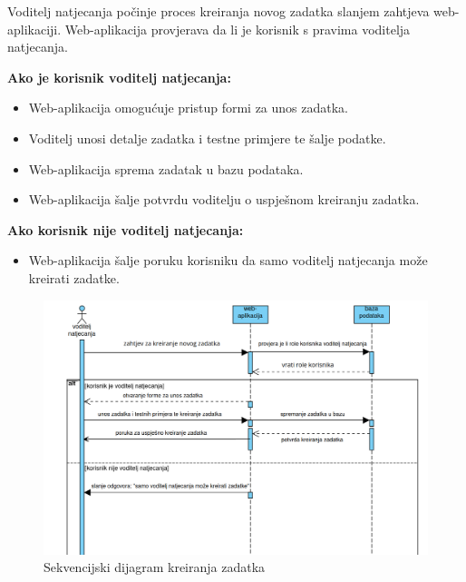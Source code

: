 \documentclass{article}
\begin{document}
Voditelj natjecanja počinje proces kreiranja novog zadatka slanjem zahtjeva web-aplikaciji.
Web-aplikacija provjerava da li je korisnik s pravima voditelja natjecanja.

\textbf{Ako je korisnik voditelj natjecanja:}
\begin{itemize}
  \item Web-aplikacija omogućuje pristup formi za unos zadatka.
  \item Voditelj unosi detalje zadatka i testne primjere te šalje podatke.
  \item Web-aplikacija sprema zadatak u bazu podataka.
  \item Web-aplikacija šalje potvrdu voditelju o uspješnom kreiranju zadatka.
\end{itemize}

\textbf{Ako korisnik nije voditelj natjecanja:}
\begin{itemize}
  \item Web-aplikacija šalje poruku korisniku da samo voditelj natjecanja može kreirati zadatke.
\end{itemize}

\begin{figure}[h!]
  \centering
  \includegraphics[width=\linewidth]{../slike/kreiranje_zadatka.png}
  \caption{Sekvencijski dijagram kreiranja zadatka}\label{fig:taskcreationdiag}
\end{figure}
\end{document}
